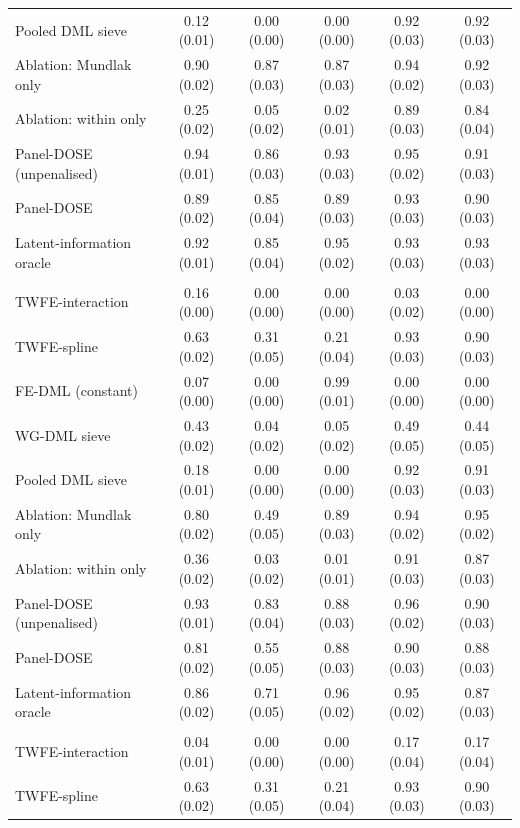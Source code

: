 \documentclass[pdflatex,sn-basic]{sn-jnl}%
\theoremstyle{thmstyleone}
\theoremstyle{thmstyletwo}
\renewenvironment{table}[1][]{\begin{tableorg}[#1]\centering\tablebodyfont}{\end{tableorg}}
\begin{document}
\begin{appendices}
\begin{table}[!ht]
{\begin{threeparttable}
\begin{tabular}{lccccc}
\quad Pooled DML sieve & 0.12 (0.01) & 0.00 (0.00) & 0.00 (0.00) & 0.92 (0.03) & 0.92 (0.03)\\
\quad Ablation: Mundlak only & 0.90 (0.02) & 0.87 (0.03) & 0.87 (0.03) & 0.94 (0.02) & 0.92 (0.03)\\
\quad Ablation: within only & 0.25 (0.02) & 0.05 (0.02) & 0.02 (0.01) & 0.89 (0.03) & 0.84 (0.04)\\
\quad Panel-DOSE (unpenalised) & 0.94 (0.01) & 0.86 (0.03) & 0.93 (0.03) & 0.95 (0.02) & 0.91 (0.03)\\
\quad Panel-DOSE & 0.89 (0.02) & 0.85 (0.04) & 0.89 (0.03) & 0.93 (0.03) & 0.90 (0.03)\\
\quad Latent-information oracle & 0.92 (0.01) & 0.85 (0.04) & 0.95 (0.02) & 0.93 (0.03) & 0.93 (0.03)\\
\addlinespace
\multicolumn{6}{l}{\textit{Design: threshold $\theta(z)$}}\\
\quad TWFE-interaction & 0.16 (0.00) & 0.00 (0.00) & 0.00 (0.00) & 0.03 (0.02) & 0.00 (0.00)\\
\quad TWFE-spline & 0.63 (0.02) & 0.31 (0.05) & 0.21 (0.04) & 0.93 (0.03) & 0.90 (0.03)\\
\quad FE-DML (constant) & 0.07 (0.00) & 0.00 (0.00) & 0.99 (0.01) & 0.00 (0.00) & 0.00 (0.00)\\
\quad WG-DML sieve & 0.43 (0.02) & 0.04 (0.02) & 0.05 (0.02) & 0.49 (0.05) & 0.44 (0.05)\\
\quad Pooled DML sieve & 0.18 (0.01) & 0.00 (0.00) & 0.00 (0.00) & 0.92 (0.03) & 0.91 (0.03)\\
\quad Ablation: Mundlak only & 0.80 (0.02) & 0.49 (0.05) & 0.89 (0.03) & 0.94 (0.02) & 0.95 (0.02)\\
\quad Ablation: within only & 0.36 (0.02) & 0.03 (0.02) & 0.01 (0.01) & 0.91 (0.03) & 0.87 (0.03)\\
\quad Panel-DOSE (unpenalised) & 0.93 (0.01) & 0.83 (0.04) & 0.88 (0.03) & 0.96 (0.02) & 0.90 (0.03)\\
\quad Panel-DOSE & 0.81 (0.02) & 0.55 (0.05) & 0.88 (0.03) & 0.90 (0.03) & 0.88 (0.03)\\
\quad Latent-information oracle & 0.86 (0.02) & 0.71 (0.05) & 0.96 (0.02) & 0.95 (0.02) & 0.87 (0.03)\\
\addlinespace
\multicolumn{6}{l}{\textit{Design: hump $\theta(z)$}}\\
\quad TWFE-interaction & 0.04 (0.01) & 0.00 (0.00) & 0.00 (0.00) & 0.17 (0.04) & 0.17 (0.04)\\
\quad TWFE-spline & 0.63 (0.02) & 0.31 (0.05) & 0.21 (0.04) & 0.93 (0.03) & 0.90 (0.03)\\

\end{tabular}
\end{threeparttable}}
\end{table}
\end{appendices}
\end{document}
